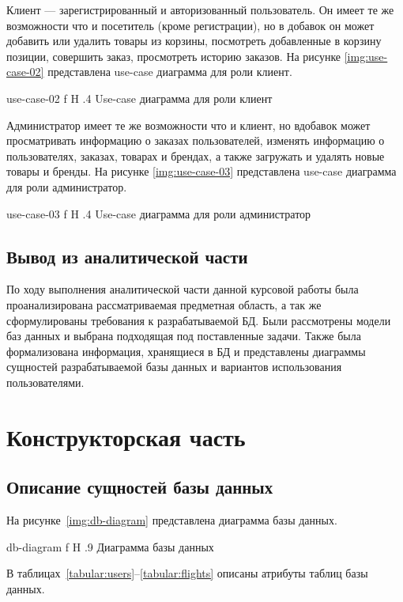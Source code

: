 \documentclass{bmstu}
\begin{document}
Клиент --- зарегистрированный и авторизованный пользователь. 
Он имеет те же возможности что и посетитель (кроме регистрации), но в добавок он может добавить или удалить товары из корзины, посмотреть добавленные в корзину позиции, совершить заказ, просмотреть историю заказов. На рисунке \ref{img:use-case-02} представлена use-case диаграмма для роли клиент.

{use-case-02}
{f}
{H}
{.4\textwidth}
{Use-case диаграмма для роли клиент}

Администратор имеет те же возможности что и клиент, но вдобавок может просматривать информацию о заказах пользователей, изменять информацию о пользователях, заказах, товарах и брендах, а также загружать и удалять новые товары и бренды. На рисунке \ref{img:use-case-03} представлена use-case диаграмма для роли администратор.

{use-case-03}
{f}
{H}
{.4\textwidth}
{Use-case диаграмма для роли администратор}

\section*{Вывод из аналитической части}

По ходу выполнения аналитической части данной курсовой работы была проанализирована рассматриваемая предметная область, а так же сформулированы требования к разрабатываемой БД. Были рассмотрены модели баз данных и выбрана подходящая под поставленные задачи. Также была формализована информация, хранящиеся в БД и представлены диаграммы сущностей разрабатываемой базы данных и вариантов использования пользователями.

\chapter{Конструкторская часть}

\section{Описание сущностей базы данных}

На рисунке~\ref{img:db-diagram} представлена диаграмма базы данных.

    {db-diagram}
    {f}
    {H}
    {.9\textwidth}
    {Диаграмма базы данных}

В таблицах~\ref{tabular:users}--\ref{tabular:flights} описаны атрибуты таблиц базы данных.
\end{document}
